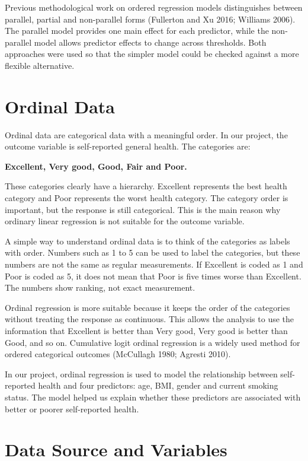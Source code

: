 \documentclass{article}
\begin{document}
Previous methodological work on ordered regression models distinguishes
between parallel, partial and non-parallel forms (Fullerton and Xu 2016;
Williams 2006). The parallel model provides one main effect for each
predictor, while the non-parallel model allows predictor effects to
change across thresholds. Both approaches were used so that the simpler
model could be checked against a more flexible alternative.

\section{Ordinal Data}\label{ordinal-data}

Ordinal data are categorical data with a meaningful order. In our
project, the outcome variable is self-reported general health. The
categories are:

\textbf{Excellent, Very good, Good, Fair and Poor.}

These categories clearly have a hierarchy. Excellent represents the best
health category and Poor represents the worst health category. The
category order is important, but the response is still categorical. This
is the main reason why ordinary linear regression is not suitable for
the outcome variable.

A simple way to understand ordinal data is to think of the categories as
labels with order. Numbers such as 1 to 5 can be used to label the
categories, but these numbers are not the same as regular measurements.
If Excellent is coded as 1 and Poor is coded as 5, it does not mean that
Poor is five times worse than Excellent. The numbers show ranking, not
exact measurement.

Ordinal regression is more suitable because it keeps the order of the
categories without treating the response as continuous. This allows the
analysis to use the information that Excellent is better than Very good,
Very good is better than Good, and so on. Cumulative logit ordinal
regression is a widely used method for ordered categorical outcomes
(McCullagh 1980; Agresti 2010).

In our project, ordinal regression is used to model the relationship
between self-reported health and four predictors: age, BMI, gender and
current smoking status. The model helped us explain whether these
predictors are associated with better or poorer self-reported health.

\section{Data Source and Variables}\label{data-source-and-variables}
\end{document}
